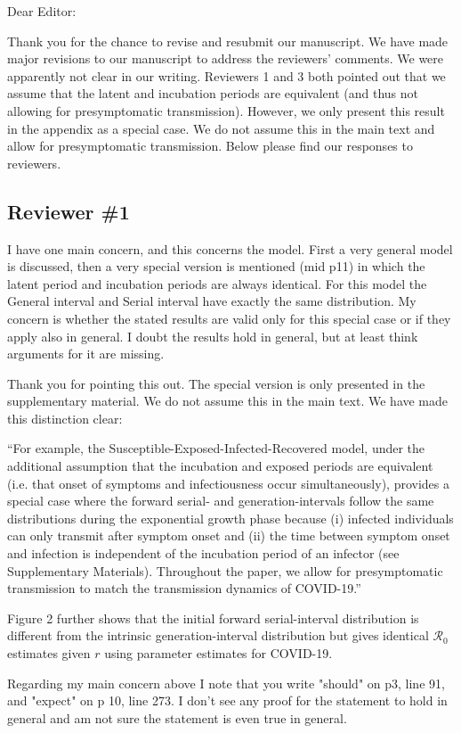 \documentclass[12pt]{article}
\newcommand{\Ro}{\ensuremath{{\mathcal R}_{0}}\xspace}
\newcommand{\rev}{\subsection*}
\newcommand{\revtext}{\textsf}
\begin{document}
\noindent Dear Editor:

Thank you for the chance to revise and resubmit our manuscript. 
We have made major revisions to our manuscript to address the reviewers' comments.
We were apparently not clear in our writing. Reviewers 1 and 3 both pointed out that we assume that the latent and incubation periods are equivalent (and thus not allowing for presymptomatic transmission). 
However, we only present this result in the appendix as a special case.
We do not assume this in the main text and allow for presymptomatic transmission.
Below please find our responses to reviewers.

\rev{Reviewer \#1}

\revtext{I have one main concern, and this concerns the model. First a very general model is discussed, then a very special version is mentioned (mid p11) in which the latent period and incubation periods are always identical. For this model the General interval and Serial interval have exactly the same distribution. My concern is whether the stated results are valid only for this special case or if they apply also in general. I doubt the results hold in general, but at least think arguments for it are missing.}

Thank you for pointing this out. The special version is only presented in the supplementary material. We do not assume this in the main text. We have made this distinction clear:

``For example, the Susceptible-Exposed-Infected-Recovered model, under the additional assumption that the incubation and exposed periods are equivalent (i.e. that onset of symptoms and infectiousness occur simultaneously), provides a special case where the forward serial- and generation-intervals follow the same distributions during the exponential growth phase because (i) infected individuals can only transmit after symptom onset and (ii) the time between symptom onset and infection is independent of the incubation period of an infector (see Supplementary Materials).
Throughout the paper, we allow for presymptomatic transmission to match the transmission dynamics of COVID-19.''

Figure 2 further shows that the initial forward serial-interval distribution is different from the intrinsic generation-interval distribution but gives identical \Ro estimates given $r$ using parameter estimates for COVID-19.

\revtext{Regarding my main concern above I note that you write "should" on p3, line 91, and "expect" on p 10, line 273. I don't see any proof for the statement to hold in general and am not sure the statement is even true in general. }
\end{document}
